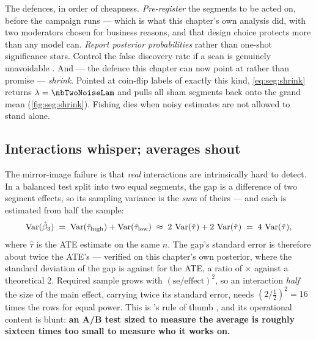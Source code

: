 

The defences, in order of cheapness. \emph{Pre-register} the segments to be acted on, before the
campaign runs --- which is what this chapter's own analysis did, with two moderators chosen for
business reasons, and that design choice protects more than any model can. \emph{Report posterior
probabilities} rather than one-shot significance stars. Control the false discovery rate if a scan
is genuinely unavoidable \citep{benjamini1995}. And --- the defence this chapter can now point at
rather than promise --- \emph{shrink}. Pointed at coin-flip labels of exactly this kind,
\cref{eq:seg:shrink} returns $\lambda = \nbTwoNoiseLam$ and pulls all \nbTwoNNoise{} sham segments
back onto the grand mean (\cref{fig:seg:shrink}). Fishing dies when noisy estimates are not allowed
to stand alone.

\subsection*{Interactions whisper; averages shout}

The mirror-image failure is that \emph{real} interactions are intrinsically hard to detect. In a
balanced test split into two equal segments, the gap is a difference of two segment effects, so its
sampling variance is the \emph{sum} of theirs --- and each is estimated from half the sample:
%
\begin{equation}
  \operatorname{Var}(\hat\beta_3) \;=\; \operatorname{Var}(\hat\tau_{\mathrm{high}}) + \operatorname{Var}(\hat\tau_{\mathrm{low}})
    \;\approx\; 2\,\operatorname{Var}(\hat\tau) + 2\,\operatorname{Var}(\hat\tau) \;=\; 4\,\operatorname{Var}(\hat\tau),
  \label{eq:seg:power}
\end{equation}
%
where $\hat\tau$ is the ATE estimate on the same $n$. The gap's standard error is therefore about
twice the ATE's --- verified on this chapter's own posterior, where the standard deviation of the
gap is \eur{\nbTwoGapSd} against \eur{\nbTwoAteSd} for the ATE, a ratio of
\nbTwoGapSdRatio$\times$ against a theoretical 2. Required sample grows with
$(\mathrm{se}/\text{effect})^2$, so an interaction \emph{half} the size of the main effect, carrying
twice its standard error, needs $(2 / \tfrac12)^2 = 16$ times the rows for equal power. This is
\citeauthor{gelman2018interactions}'s rule of thumb \citep{gelman2018interactions,
gelmanhill2007}, and its operational content is blunt: \textbf{an A/B test sized to measure the
average is roughly sixteen times too small to measure who it works on.}

